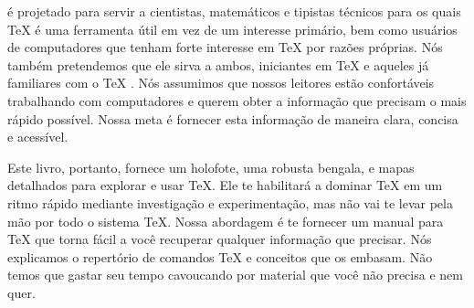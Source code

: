 \thisbook\/ é projetado para servir a cientistas, matemáticos e tipistas
técnicos para os quais \TeX{} é uma ferramenta útil em vez de um interesse
primário, bem como usuários de computadores que tenham forte interesse em \TeX{}
por razões próprias. Nós também pretendemos que ele sirva a ambos, iniciantes em
\TeX{} e aqueles já familiares com o \TeX{} . Nós assumimos que nossos leitores
estão confortáveis trabalhando com computadores e querem obter a informação que
precisam o mais rápido possível. Nossa meta é fornecer esta informação de
maneira clara, concisa e acessível.

{\tighten Este livro, portanto, fornece um holofote, uma robusta bengala, e
mapas detalhados para explorar e usar \TeX{}. Ele te habilitará a dominar \TeX{}
em um ritmo rápido mediante investigação e experimentação, mas não vai te levar
pela mão por todo o sistema \TeX{}. Nossa abordagem é te fornecer um manual para
\TeX{} que torna fácil a você recuperar qualquer informação que precisar. Nós
explicamos o repertório de comandos \TeX{} e conceitos que os embasam. Não temos
que gastar seu tempo cavoucando por material que você não precisa e nem
quer. \par}

